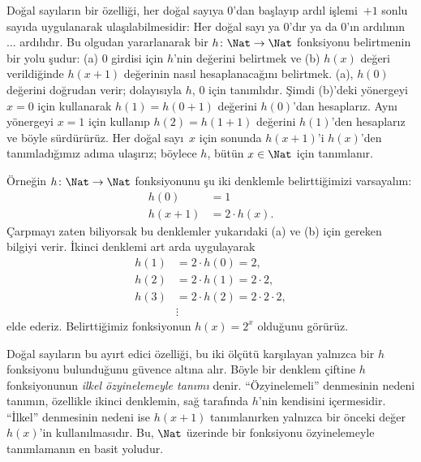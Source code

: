 


Doğal sayıların bir özelliği, her doğal sayıya $0$'dan başlayıp ardıl
işlemi~$+1$ sonlu sayıda uygulanarak ulaşılabilmesidir: Her doğal sayı
ya $0$'dır ya da $0$'ın ardılının ... ardılıdır. Bu olgudan
yararlanarak bir $h\colon\Nat\to\Nat$ fonksiyonu belirtmenin bir yolu
şudur: (a) $0$ girdisi için $h$'nin değerini belirtmek ve (b) $h(x)$
değeri verildiğinde $h(x+1)$ değerinin nasıl hesaplanacağını belirtmek.
(a), $h(0)$ değerini doğrudan verir; dolayısıyla $h$, $0$ için
tanımlıdır. Şimdi (b)'deki yönergeyi $x=0$ için kullanarak
$h(1)=h(0+1)$ değerini $h(0)$'dan hesaplarız. Aynı yönergeyi $x=1$
için kullanıp $h(2)=h(1+1)$ değerini $h(1)$'den hesaplarız ve böyle
sürdürürüz. Her doğal sayı~$x$ için sonunda $h(x+1)$'i $h(x)$'den
tanımladığımız adıma ulaşırız; böylece $h$, bütün $x\in\Nat$ için
tanımlanır.

Örneğin $h\colon\Nat\to\Nat$ fonksiyonunu şu iki denklemle
belirttiğimizi varsayalım:
\begin{align*}
h(0) & =  1\\
h(x+1) & =  2 \cdot h(x).
\end{align*}
Çarpmayı zaten biliyorsak bu denklemler yukarıdaki (a) ve (b) için
gereken bilgiyi verir. İkinci denklemi art arda uygulayarak
\begin{align*}
  h(1) & = 2\cdot h(0) = 2,\\
  h(2) & = 2\cdot h(1) = 2\cdot 2,\\
  h(3) & = 2 \cdot h(2) = 2\cdot 2 \cdot 2,\\
  & \vdots
\end{align*}
elde ederiz. Belirttiğimiz fonksiyonun $h(x)=2^x$ olduğunu görürüz.

Doğal sayıların bu ayırt edici özelliği, bu iki ölçütü karşılayan
yalnızca bir $h$ fonksiyonu bulunduğunu güvence altına alır. Böyle bir
denklem çiftine $h$ fonksiyonunun \emph{ilkel özyinelemeyle tanımı}
denir. ``Özyinelemeli'' denmesinin nedeni tanımın, özellikle ikinci
denklemin, sağ tarafında $h$'nin kendisini içermesidir. ``İlkel''
denmesinin nedeni ise $h(x+1)$ tanımlanırken yalnızca bir önceki
değer~$h(x)$'in kullanılmasıdır. Bu, $\Nat$ üzerinde bir fonksiyonu
özyinelemeyle tanımlamanın en basit yoludur.

